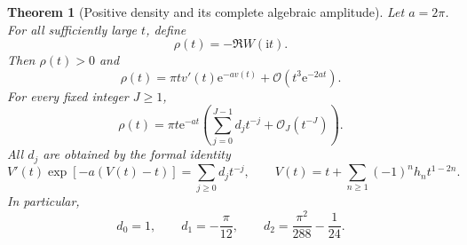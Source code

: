 \documentclass[11pt,a4paper]{article}
\newtheorem{theorem}{Theorem}[section]
\theoremstyle{definition}
\numberwithin{equation}{section}
\newcommand{\ii}{\mathrm{i}}
\newcommand{\ee}{\mathrm{e}}
\newcommand{\Oh}{\mathcal O}
\begin{document}
\begin{theorem}[Positive density and its complete algebraic amplitude]
\label{thm:density}
Let $a=2\pi$. For all sufficiently large $t$, define
\begin{equation}
 \rho(t)=-\Re W(\ii t).
 \label{eq:rho}
\end{equation}
Then $\rho(t)>0$ and
\begin{equation}
 \rho(t)=\pi t v'(t)\ee^{-a v(t)}+\Oh(t^3\ee^{-2at}).
 \label{eq:rho-v}
\end{equation}
For every fixed integer $J\ge1$,
\begin{equation}
 \rho(t)=\pi t\ee^{-at}
 \left(\sum_{j=0}^{J-1}d_jt^{-j}+\Oh_J(t^{-J})\right).
 \label{eq:rho-asympt}
\end{equation}
All $d_j$ are obtained by the formal identity
\begin{equation}
 V'(t)\exp[-a(V(t)-t)]=\sum_{j\ge0}d_jt^{-j},\qquad
 V(t)=t+\sum_{n\ge1}(-1)^nh_nt^{1-2n}.
 \label{eq:d-algorithm}
\end{equation}
In particular,
\begin{equation}
 d_0=1,\qquad d_1=-\frac\pi{12},\qquad
 d_2=\frac{\pi^2}{288}-\frac1{24}.
 \label{eq:d-first}
\end{equation}
\end{theorem}
\end{document}
